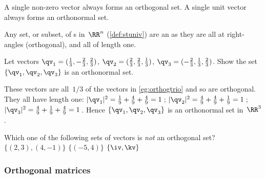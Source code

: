A single non-zero vector always forms an orthogonal set.  
A single unit vector always forms an orthonormal set.


\begin{example} \label{eg:}
Any set, or subset, of s in~\(\RR^n\) (\autoref{def:stuniv}) are an  as they are all at right-angles (orthogonal), and all of length one.
\end{example}

\begin{example} \label{eg:}
Let vectors \(\qv_1=(\frac13,-\frac23,\frac23)\), \(\qv_2=(\frac23,\frac23,\frac13)\), \(\qv_3=(-\frac23,\frac13,\frac23)\).  
Show the set \(\{\qv_1,\qv_2,\qv_3\}\) is an orthonormal set.
\begin{solution} 
These vectors are all~\(1/3\) of the vectors in \autoref{eg:orthogtrio} and so are orthogonal.
They all have length one:
\(|\qv_1|^2={\frac19+\frac49+\frac49}=1\)\,;
\(|\qv_2|^2={\frac49+\frac49+\frac19}=1\)\,;
\(|\qv_3|^2={\frac49+\frac19+\frac49}=1\)\,.
Hence \(\{\qv_1,\qv_2,\qv_3\}\) is an orthonormal set in~\(\RR^3\). 
\end{solution}
\end{example}



\begin{activity}
Which one of the following sets of vectors is \emph{not} an orthogonal set?
{\(\{(2,3),(4,-1)\}\)}
{\(\{(-5,4)\}\)}
{\(\{\iv,\kv\}\)}
\end{activity}





\subsubsection{Orthogonal matrices}

